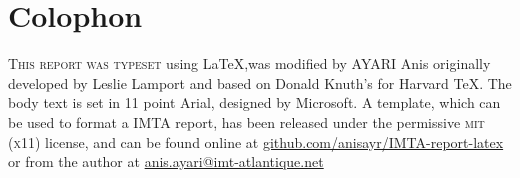 \chapter*{Colophon}

\begin{center}
\parbox{200pt}{\raggedright\lettrine[lines=3,slope=-2pt,nindent=-4pt]{\textcolor{IMTA-Blue}{T}}{his report was typeset} using \LaTeX,was modified by AYARI Anis originally developed by Leslie Lamport and based on Donald Knuth's for Harvard \TeX. The body text is set in 11 point Arial, designed by Microsoft. A template, which can be used to format a IMTA report, has been released under the permissive \textsc{mit} (\textsc{x}11) license, and can be found online at \href{https://github.com/anisayr/IMTA-report-latex}{github.com/anisayr/IMTA-report-latex} or from the author at \href{mailto:anis.ayari@imt-atlantique.net}{anis.ayari@imt-atlantique.net}
}
\end{center}